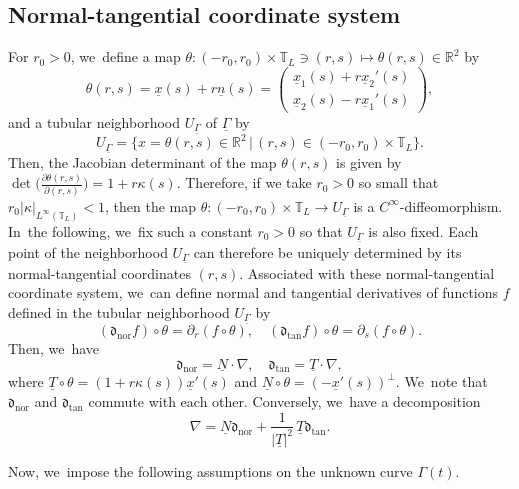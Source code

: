 \documentclass[10pt]{amsart}
\newcommand{\dtan}{{\mathfrak d}_\mathrm{tan}}
\newcommand{\dnor}{{\mathfrak d}_\mathrm{nor}}
\newcommand{\R}{{\mathbb R}}
\newcommand{\ul}[1]{\underline{#1}}
\newcommand{\itGamma}{\mathit{\Gamma}}
\theoremstyle{definition}
\begin{document}
\subsection{Normal-tangential coordinate system}\label{subsect:NTCS}
For $r_0>0$, we~define a map $\theta: (-r_0,r_0)\times\mathbb{T}_L\ni(r,s) \mapsto \theta(r,s)\in\R^2$ by
\begin{equation}\label{diffeo-theta}
\theta(r,s) = \ul{x}(s) + r\ul{n}(s) =
\begin{pmatrix}
\ul{x}_1(s) + r\ul{x}_2'(s) \\
\ul{x}_2(s) - r\ul{x}_1'(s)
\end{pmatrix},
\end{equation}
and a tubular neighborhood $U_{\ul{\itGamma}}$ of $\ul{\itGamma}$ by
\[
U_{\ul{\itGamma}} = \bigl\{ x=\theta(r,s)\in\R^2 \,|\, (r,s)\in (-r_0,r_0)\times\mathbb{T}_L \bigr\}.
\]
Then, the Jacobian determinant of the map $\theta(r,s)$ is given by $\det\bigl(\frac{\partial\theta(r,s)}{\partial(r,s)} \bigr) = 1+r\kappa(s)$.
Therefore, if we take $r_0>0$ so small that $r_0 |\kappa|_{L^\infty(\mathbb{T}_L)}<1$,
then the map \hbox{$\theta: (-r_0,r_0)\times\mathbb{T}_L \to U_{\ul{\itGamma}}$} is a $C^\infty$-diffeomorphism. In~the following, we~fix such a constant $r_0>0$ so that $U_{\ul{\itGamma}}$ is also fixed.
Each point of the neighborhood $U_{\ul{\itGamma}}$ can therefore be uniquely determined by its normal-tangential coordinates $(r, s)$.
Associated with these normal-tangential coordinate system, we~can define normal and tangential derivatives of functions $f$ defined in the tubular neighborhood $U_{\ul{\itGamma}}$ by
\begin{equation}\label{NorTanD}
(\dnor f)\circ\theta = \partial_r(f\circ\theta), \quad
(\dtan f)\circ\theta = \partial_s(f\circ\theta).
\end{equation}
Then, we~have
\begin{equation}\label{NorTanD2}
\dnor = \ul{N}\cdot\nabla,\quad
\dtan = \ul{T}\cdot\nabla,
\end{equation}
where $\ul{T}\circ\theta = (1+r\kappa(s))\ul{x}'(s)$ and $\ul{N}\circ\theta = (-\ul{x}'(s))^\perp$. We~note that $\dnor$ and $\dtan$ commute with each other.
Conversely, we~have a decomposition
\begin{equation}\label{diff deco}
\nabla = \ul{N}\dnor + \frac{1}{|\ul{T}|^2}\,{\ul{T}}\dtan.
\end{equation}

Now, we~impose the following assumptions on the unknown curve $\itGamma(t)$.
\end{document}
